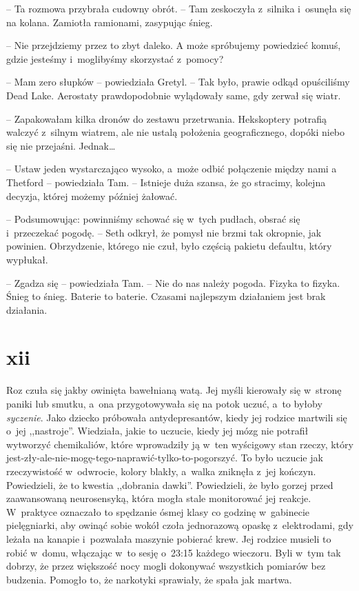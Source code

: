 \documentclass[oneside,polish,11pt,sfheadings]{mwbk}
\begin{document}
-- Ta rozmowa przybrała cudowny obrót. -- Tam zeskoczyła z~silnika i~osunęła się na kolana. Zamiotła ramionami, zasypując śnieg. 

-- Nie
przejdziemy przez to zbyt daleko. A może spróbujemy powiedzieć komuś,
gdzie jesteśmy i~moglibyśmy skorzystać z~pomocy?

-- Mam zero słupków -- powiedziała Gretyl. -- Tak było, prawie odkąd
opuściliśmy Dead Lake. Aerostaty prawdopodobnie wylądowały same, gdy
zerwał się wiatr.

-- Zapakowałam kilka dronów do zestawu przetrwania. Hekskoptery potrafią
walczyć z~silnym wiatrem, ale nie ustalą położenia geograficznego,
dopóki niebo się nie przejaśni. Jednak\ldots 

-- Ustaw jeden wystarczająco wysoko, a~może odbić połączenie między nami
a Thetford -- powiedziała Tam. -- Istnieje duża szansa, że go stracimy,
kolejna decyzja, której możemy później żałować.

-- Podsumowując: powinniśmy schować się w~tych pudłach, obsrać się i~przeczekać pogodę. -- Seth odkrył, że pomysł nie brzmi tak okropnie, jak
powinien. Obrzydzenie, którego nie czuł, było częścią pakietu defaultu,
który wypłukał.

-- Zgadza się -- powiedziała Tam. -- Nie do nas należy pogoda. Fizyka to
fizyka. Śnieg to śnieg. Baterie to baterie. Czasami najlepszym
działaniem jest brak działania.

\chapter*{xii}

Roz czuła się jakby owinięta bawełnianą watą. Jej myśli kierowały się w~stronę paniki lub smutku, a~ona przygotowywała się na potok uczuć, a~to
byłoby \textit{syczenie}. Jako dziecko próbowała antydepresantów, kiedy
jej rodzice martwili się o~jej ,,nastroje''. Wiedziała, jakie to
uczucie, kiedy jej mózg nie potrafił wytworzyć chemikaliów, które
wprowadziły ją w~ten wyścigowy stan rzeczy, który
jest-zły-ale-nie-mogę-tego-naprawić-tylko-to-pogorszyć. To było uczucie
jak rzeczywistość w~odwrocie, kolory blakły, a~walka zniknęła z~jej
kończyn. Powiedzieli, że to kwestia ,,dobrania dawki''. Powiedzieli, że
było gorzej przed zaawansowaną neurosensyką, która mogła stale
monitorować jej reakcje. W~praktyce oznaczało to spędzanie ósmej klasy
co godzinę w~gabinecie pielęgniarki, aby owinąć sobie wokół czoła
jednorazową opaskę z~elektrodami, gdy leżała na kanapie i~pozwalała
maszynie pobierać krew. Jej rodzice musieli to robić w~domu, włączając w~to sesję o~23:15 każdego wieczoru. Byli w~tym tak dobrzy, że przez
większość nocy mogli dokonywać wszystkich pomiarów bez budzenia. Pomogło
to, że narkotyki sprawiały, że spała jak martwa.
\end{document}

